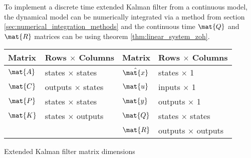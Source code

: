 \begin{remark}
  To implement a discrete time extended Kalman filter from a continuous model,
  the dynamical model can be numerically integrated via a method from section
  \ref{sec:numerical_integration_methods} and the continuous time $\mat{Q}$ and
  $\mat{R}$ matrices can be  using theorem
  \ref{thm:linear_system_zoh}.
\end{remark}
\begin{booktable}
  \begin{tabular}{|ll|ll|}
    \hline
    \rowcolor{headingbg}
    \textbf{Matrix} & \textbf{Rows $\times$ Columns} &
    \textbf{Matrix} & \textbf{Rows $\times$ Columns} \\
    \hline
    $\mat{A}$ & states $\times$ states & $\hat{\mat{x}}$ & states $\times$ 1 \\
    $\mat{C}$ & outputs $\times$ states & $\mat{u}$ & inputs $\times$ 1 \\
    $\mat{P}$ & states $\times$ states & $\mat{y}$ & outputs $\times$ 1 \\
    $\mat{K}$ & states $\times$ outputs & $\mat{Q}$ & states $\times$ states \\
              &                         & $\mat{R}$ & outputs $\times$ outputs \\
    \hline
  \end{tabular}
  \caption{Extended Kalman filter matrix dimensions}
\end{booktable}
